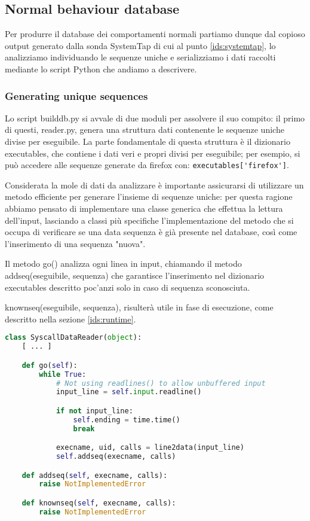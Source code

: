 \documentclass[11pt]{article}
\begin{document}
\subsection{Normal behaviour database}
\label{ids:database}
Per produrre il database dei comportamenti normali partiamo dunque dal copioso
output generato dalla sonda SystemTap di cui al punto \ref{ids:systemtap}, lo
analizziamo individuando le sequenze uniche e serializziamo i dati raccolti
mediante lo script Python che andiamo a descrivere.

\subsubsection{Generating unique sequences}
Lo script builddb.py si avvale di due moduli per assolvere il suo compito: il
primo di questi, reader.py, genera una struttura dati contenente le sequenze
uniche divise per eseguibile. La parte fondamentale di questa struttura è il
dizionario executables, che contiene i dati veri e propri divisi per
eseguibile; per esempio, si può accedere alle sequenze generate da firefox con:
\verb|executables['firefox']|.

Considerata la mole di dati da analizzare è importante assicurarsi di
utilizzare un metodo efficiente per generare l'insieme di sequenze uniche: per
questa ragione abbiamo pensato di implementare una classe generica che effettua
la lettura dell'input, lasciando a classi più specifiche l'implementazione del
metodo che si occupa di verificare se una data sequenza è già presente nel
database, così come l'inserimento di una sequenza "nuova".

Il metodo go() analizza ogni linea in input, chiamando il metodo
addseq(eseguibile, sequenza) che garantisce l'inserimento nel dizionario
executables descritto poc'anzi solo in caso di sequenza sconosciuta.

knownseq(eseguibile, sequenza), risulterà utile in fase di esecuzione, come
descritto nella sezione \ref{ids:runtime}.

\begin{lstlisting}[language=Python]
class SyscallDataReader(object):
    [ ... ]

    def go(self):
        while True:
            # Not using readlines() to allow unbuffered input
            input_line = self.input.readline()

            if not input_line:
                self.ending = time.time()
                break

            execname, uid, calls = line2data(input_line)
            self.addseq(execname, calls)

    def addseq(self, execname, calls):
        raise NotImplementedError

    def knownseq(self, execname, calls):
        raise NotImplementedError
\end{lstlisting}
\end{document}
